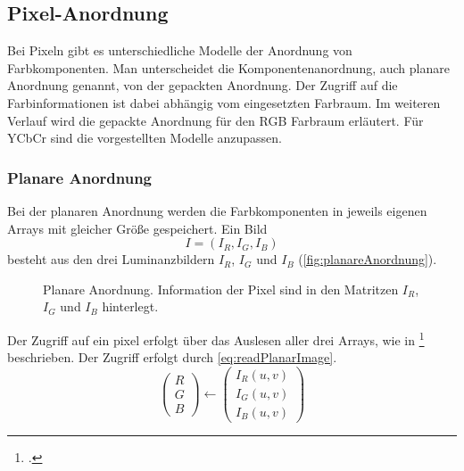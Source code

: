 \subsection{Pixel-Anordnung} %
\label{sub:pixelanordnung}
Bei Pixeln gibt es unterschiedliche Modelle der Anordnung von Farbkomponenten. Man unterscheidet die
 Komponentenanordnung, auch planare Anordnung genannt, von der gepackten Anordnung. Der Zugriff auf die
 Farbinformationen ist dabei abhängig vom eingesetzten Farbraum. Im weiteren Verlauf wird die gepackte Anordnung für den
 RGB Farbraum erläutert. Für YCbCr sind die vorgestellten Modelle anzupassen.

\subsubsection{Planare Anordnung} %
\label{sub:planare_anordnung}
Bei der planaren Anordnung werden die Farbkomponenten in jeweils eigenen Arrays mit gleicher Größe gespeichert. Ein Bild
\begin{equation}
	I = \left(I_R, I_G, I_B\right)
	\label{eq:planarImage}
\end{equation}
besteht aus den drei Luminanzbildern $I_R$, $I_G$ und $I_B$ (\autoref{fig:planareAnordnung}).
\begin{figure}[!ht]
	\centering
	
	\caption{Planare Anordnung. Information der Pixel sind in den Matritzen $I_R$, $I_G$ und $I_B$ hinterlegt.}
	\label{fig:planareAnordnung}
\end{figure}
Der Zugriff auf ein \gls{pixel} erfolgt über das Auslesen aller drei Arrays, wie in
 \citeauthor{burger05}\footcite[Vgl.][S.~235--236]{burger05} beschrieben. Der Zugriff erfolgt durch
 \autoref{eq:readPlanarImage}.
\begin{equation}
	\begin{pmatrix}
		R\\
		G\\
		B
	\end{pmatrix}
	\leftarrow
	\begin{pmatrix}
		I_R\left(u,v\right)\\
		I_G\left(u,v\right)\\
		I_B\left(u,v\right)
	\end{pmatrix}
	\label{eq:readPlanarImage}
\end{equation}

